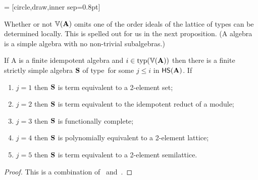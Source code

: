 \newcommand{\dotsize}{0.8pt}
 = [circle,draw,inner sep=\dotsize]
\begin{center}
\newcommand{\figscale}{.7}
\end{center}
Whether or not $\operatorname{\mathbb{V}}(\mathbf{A})$ omits one of the order ideals of the lattice of types can be
determined locally.  This is spelled out for us in the next proposition.
(A  algebra is a simple
algebra with no non-trivial subalgebras.)


\begin{prop}
  \label{prop:2.1}
If A is a finite idempotent algebra and $i \in \operatorname{typ}(\operatorname{\mathbb{V}}(\mathbf{A}))$ then there
is a finite strictly simple algebra $\mathbf{S}$ of type~\jtyp for 
some $j \leq i$ in $\mathsf{H} \mathsf{S} (\mathbf{A})$.
If
\begin{enumerate}[(1)]
\item 
  $j = 1$ then $\mathbf{S}$ is term equivalent to a 2-element set;
\item
  $j = 2$ then $\mathbf{S}$ is term equivalent to the idempotent reduct of a module;
\item
  $j = 3$ then $\mathbf{S}$ is functionally complete;
\item
  $j = 4$ then $\mathbf{S}$ is polynomially equivalent to a 2-element lattice;
\item
  $j = 5$ then $\mathbf{S}$ is term equivalent to a 2-element semilattice.
\end{enumerate}
\end{prop}
\begin{proof}
  This is a combination of~\cite[Prop.~3.1]{MR2504025} and~\cite[Thm.~6.1]{MR1191235}.
\end{proof}

